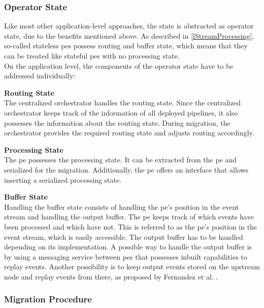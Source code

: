 \subsubsection{Operator State}
\label{lOperatorState}
Like most other application-level approaches, the state is abstracted as operator state, due to the benefits mentioned above. As described in \ref{lStreamProcessing}, so-called stateless \gls{pe}s possess routing and buffer state, which means that they can be treated like stateful \gls{pe}s with no processing state.\\
On the application level, the components of the operator state have to be addressed individually:\par

\textbf{Routing State}\\
The centralized orchestrator handles the routing state. Since the centralized orchestrator keeps track of the information of all deployed pipelines, it also possesses the information about the routing state. During migration, the orchestrator provides the required routing state and adjusts routing accordingly.\par

\textbf{Processing State}\\
The \gls{pe} possesses the processing state. It can be extracted from the \gls{pe} and serialized for the migration. Additionally, the \gls{pe} offers an interface that allows inserting a serialized processing state.\par

\textbf{Buffer State}\\
Handling the buffer state consists of handling the \gls{pe}'s position in the event stream and handling the output buffer. The \gls{pe} keeps track of which events have been processed and which have not. This is referred to as the \gls{pe}'s position in the event stream, which is easily accessible. The output buffer has to be handled depending on its implementation. A possible way to handle the output buffer is by using a messaging service between \gls{pe}s that possesses inbuilt capabilities to replay events. Another possibility is to keep output events stored on the upstream node and replay events from there, as proposed by Fernandez et al. \cite{CastroFernandez.2013}.\par

\subsubsection{Migration Procedure}
\label{lMigrationProceedure}

